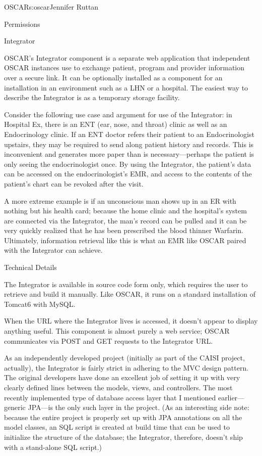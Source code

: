 \begin{aosachapter}{OSCAR}{s:oscar}{Jennifer Ruttan}
\begin{aosasect1}{Permissions}
\end{aosasect1}

\begin{aosasect1}{Integrator}

OSCAR's Integrator component is a separate web application that
independent OSCAR instances use to exchange patient, program and
provider information over a secure link. It can be optionally
installed as a component for an installation in an environment such as
a LHN or a hospital. The easiest way to describe the Integrator is as
a temporary storage facility.

Consider the following use case and argument for use of the
Integrator: in Hospital Ex, there is an ENT (ear, nose, and throat)
clinic as well as an Endocrinology clinic. If an ENT doctor refers
their patient to an Endocrinologist upstairs, they may be required to
send along patient history and records. This is inconvenient and
generates more paper than is necessary---perhaps the patient is only
seeing the endocrinologist once. By using the Integrator, the
patient's data can be accessed on the endocrinologist's EMR, and
access to the contents of the patient's chart can be revoked after the
visit.

A more extreme example is if an unconscious man shows up in an ER with
nothing but his health card; because the home clinic and the
hospital's system are connected via the Integrator, the man's record
can be pulled and it can be very quickly realized that he has been
prescribed the blood thinner Warfarin. Ultimately, information
retrieval like this is what an EMR like OSCAR paired with the
Integrator can achieve.

\begin{aosasect2}{Technical Details}

The Integrator is available in source code form only, which requires
the user to retrieve and build it manually. Like OSCAR, it runs on a
standard installation of Tomcat6 with MySQL.

When the URL where the Integrator lives is accessed, it doesn't appear
to display anything useful. This component is almost purely a web
service; OSCAR communicates via POST and GET requests to the
Integrator URL.

As an independently developed project (initially as part of the CAISI
project, actually), the Integrator is fairly strict in adhering to the
MVC design pattern. The original developers have done an excellent job
of setting it up with very clearly defined lines between the models,
views, and controllers. The most recently implemented type of database
access layer that I mentioned earlier---generic JPA---is the only such
layer in the project. (As an interesting side note: because the entire
project is properly set up with JPA annotations on all the model
classes, an SQL script is created at build time that can be used to
initialize the structure of the database; the Integrator, therefore,
doesn't ship with a stand-alone SQL script.)


\end{aosasect2}
\end{aosasect1}
\end{aosachapter}
